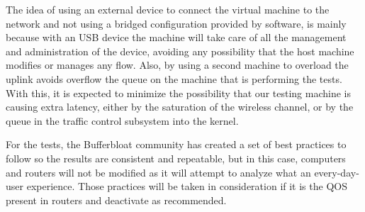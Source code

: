The idea of using an external device to connect the virtual machine to the 
network and not using a bridged configuration provided by software, is mainly 
because with an USB device the machine will take care of all the management and 
administration of the device, avoiding any possibility that the host machine 
modifies or manages any flow. Also, by using a second machine to overload the 
uplink avoids overflow the queue on the machine that is performing 
the tests. With this, it is expected to minimize the possibility that our 
testing machine is causing extra latency, either by the saturation of the 
wireless channel, or by the queue in the traffic control subsystem into the 
kernel. 

For the tests, the Bufferbloat community\cite{bloat} has created a set of best 
practices\cite{tg12} to follow so the results are consistent and repeatable, 
but in this case, computers and routers will not be modified as it will attempt 
to analyze what an every-day-user experience. Those practices will be taken in 
consideration if it is the QOS present in routers and deactivate as recommended.
 
